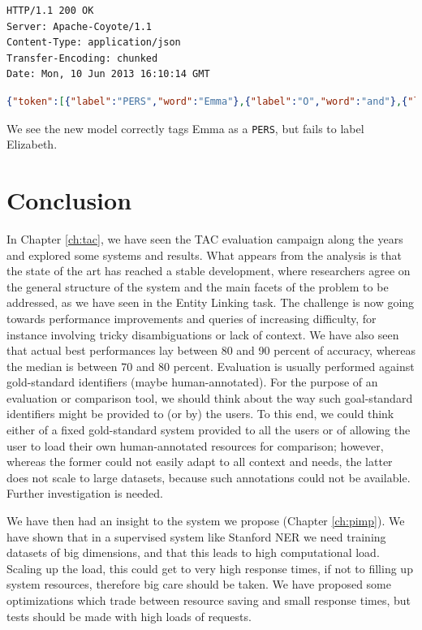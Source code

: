 \documentclass[a4paper,11pt]{report}
\begin{document}
\begin{enumerate}
\begin{lstlisting}
HTTP/1.1 200 OK
Server: Apache-Coyote/1.1
Content-Type: application/json
Transfer-Encoding: chunked
Date: Mon, 10 Jun 2013 16:10:14 GMT
\end{lstlisting}
\begin{lstlisting}[language=json]
{"token":[{"label":"PERS","word":"Emma"},{"label":"O","word":"and"},{"label":"O","word":"Elizabeth"},{"label":"O","word":"shared"},{"label":"O","word":"a"},{"label":"O","word":"dream"},{"label":"O","word":"."}]}
\end{lstlisting}
We see the new model correctly tags Emma as a \texttt{PERS}, but fails to label Elizabeth.
\end{enumerate}


\chapter{Conclusion}
In Chapter \ref{ch:tac}, we have seen the TAC evaluation campaign along the years and explored some systems and results. What appears from the analysis is that the state of the art has reached a stable development, where researchers agree on the general structure of the system and the main facets of the problem to be addressed, as we have seen in the Entity Linking task. The challenge is now going towards performance improvements and queries of increasing difficulty, for instance involving tricky disambiguations or lack of context.
We have also seen that actual best performances lay between 80 and 90 percent of accuracy, whereas the median is between 70 and 80 percent. %
Evaluation is usually performed against gold-standard identifiers (maybe human-annotated).  For the purpose of an evaluation or comparison tool, we should think about the way such goal-standard identifiers might be provided to (or by) the users. To this end, we could think either of a fixed gold-standard system provided to all the users or of allowing the user to load their own human-annotated resources for comparison; however, whereas the former could not easily adapt to all context and needs, the latter does not scale to large datasets, because such annotations could not be available. Further investigation is needed.

We have then had an insight to the system we propose (Chapter \ref{ch:pimp}). We have shown that in a supervised system like Stanford NER we need training datasets of big dimensions, and that this leads to high computational load. Scaling up the load, this could get to very high response times, if not to filling up system resources, therefore big care should be taken. We have proposed some optimizations which trade between resource saving and small response times, but tests should be made with high loads of requests.
\end{document}
